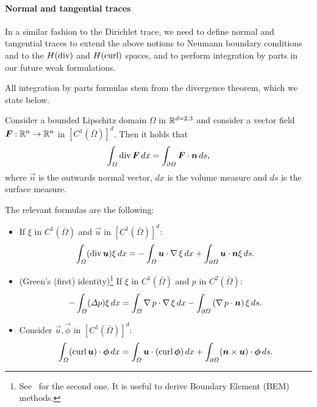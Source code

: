 \paragraph{Normal and tangential traces}
In a similar fashion to the Dirichlet trace, we need to define normal and tangential traces to extend the above notions to Neumann boundary conditions and to the $H(\operatorname{\text{div}})$ and $H(\operatorname{\text{curl}})$ spaces, and to perform integration by parts in our future weak formulations.

All integration by parts formulas stem from the divergence theorem, which we state below.
\begin{theorem}\label{thm:divergence}
    Consider a bounded Lipschitz domain $\Omega$ in $\mathbb{R}^{d=2,3}$ and consider a vector field $\vec F:\R^n \to \R^n$ in $[C^1(\bar\Omega)]^d$. Then it holds that
    \begin{equation*}
        \int_\Omega \dive \vec F\,dx = \int_{\partial\Omega}\vec F\cdot \vec n\,ds,
    \end{equation*}
    where $\vec n$ is the outwards normal vector, $dx$ is the volume measure and $ds$ is the surface measure.
\end{theorem}
The relevant formulas are the following: 
\begin{itemize}
    \item If $\xi$ in $C^1(\bar\Omega)$ and $\vec u$ in $[C^1(\bar\Omega)]^d$:
    \begin{equation}
        \int_\Omega (\dive \vec u) \xi\,dx = -\int_\Omega\vec u\cdot \grad \xi\,dx + \int_{\partial\Omega} \vec u \cdot \vec n \xi\,ds.
    \end{equation}
    \item (Green's (first) identity)\footnote{See~\cite{monk2003finite} for the second one. It is useful to derive Boundary Element (BEM) methods.} If $\xi$ in $C^1(\bar\Omega)$ and $p$ in $C^2(\bar\Omega)$:
    \begin{equation}
        -\int_\Omega (\Delta p) \xi\,dx = \int_\Omega\grad p\cdot \grad \xi\,dx - \int_{\partial\Omega}\left(\grad p\cdot \vec n\right)\xi\,ds.
    \end{equation}
    \item Consider $\vec u,\vec \phi$ in $[C^1(\bar\Omega)]^d$: 
    \begin{equation}
        \int_\Omega (\curl \vec u) \cdot \vec\phi\,dx = \int_\Omega \vec u \cdot (\curl \vec \phi)\,dx  + \int_{\partial\Omega}(\vec n\times \vec u)\cdot \vec\phi\,ds.
    \end{equation}
\end{itemize}

